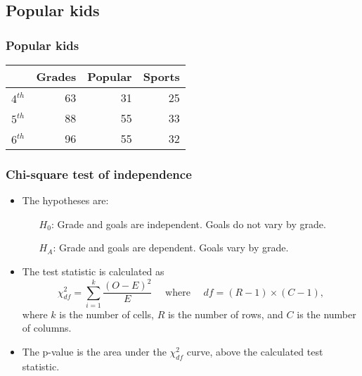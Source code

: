 \documentclass[slidestop,compress,mathserif]{beamer}
\begin{document}
\subsection{Popular kids}


\begin{frame}
\frametitle{Popular kids}


{
\begin{center}
\begin{tabular}{rrrr}
  \hline
 & Grades & Popular & Sports \\ 
  \hline
$4^{th}$ &  63 &  31 &  25 \\ 
$5^{th}$ &  88 &  55 &  33 \\ 
$6^{th}$ &  96 &  55 &  32 \\ 
   \hline
\end{tabular}
\end{center}
}
{
\begin{center}
\end{center}
}


\end{frame}


\begin{frame}
\frametitle{Chi-square test of independence}

\begin{itemize}
\item The hypotheses are:
\begin{itemize}
\item[$H_0$:] Grade and goals are independent. Goals do not vary by grade.
\item[$H_A$:] Grade and goals are dependent. Goals vary by grade.
\end{itemize}

\pause

\item The test statistic is calculated as
\[ \chi^2_{df} = \sum_{i = 1}^{k} \frac{(O - E)^2}{E} \quad \text{ where } \quad df = (R - 1) \times (C - 1), \]
where $k$ is the number of cells, $R$ is the number of rows, and $C$ is the number of columns.


\pause

\item The p-value is the area under the $\chi^2_{df}$ curve, above the calculated test statistic.

\end{itemize}


\end{frame}
\end{document}
